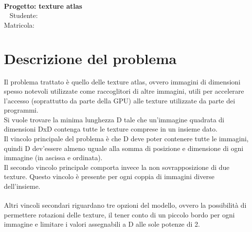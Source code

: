 

\begin{center}
	\hspace{0pt}
	\vfill
	\Huge{
		\textbf{\thetitle} \\
		\LARGE{\textbf{Progetto: texture atlas}} \\
		\ \newline \newline \newline
		\Large{	Studente: \textbf{\theauthor} } \\
		\normalsize{{Matricola: \textbf{\matNum}} }
	}
	\vfill
	\hspace{0pt}
\end{center}
\newpage




\tableofcontents    
\newpage





\section{Descrizione del problema}



Il problema trattato è quello delle texture atlas, ovvero immagini di dimensioni spesso notevoli utilizzate come raccoglitori di altre immagini, utili per accelerare l’accesso (soprattutto da parte della GPU) alle texture utilizzate da parte dei programmi. \\
Si vuole trovare la minima lunghezza D tale che un’immagine quadrata di dimensioni DxD contenga tutte le texture comprese in un insieme dato. \\
Il vincolo principale del problema è che D deve poter contenere tutte le immagini, quindi D dev’essere almeno uguale alla somma di posizione e dimensione di ogni immagine (in ascissa e ordinata). \\
Il secondo vincolo principale comporta invece la non sovrapposizione di due texture. Questo vincolo è presente per ogni coppia di immagini diverse dell’insieme. \\
\ \\
Altri vincoli secondari riguardano tre opzioni del modello, ovvero la possibilità di permettere rotazioni delle texture, il tener conto di un piccolo bordo per ogni immagine e limitare i valori assegnabili a D alle sole potenze di 2.


\newpage

